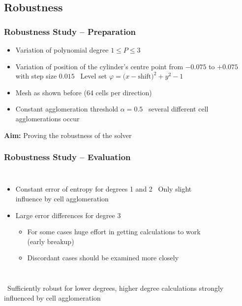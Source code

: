 	\subsection{Robustness}
	\begin{frame}
		\frametitle{Robustness Study -- Preparation}
		\begin{itemize}
			\item Variation of polynomial degree $ 1 \leq P \leq 3$
			\pause
			\item Variation of position of the cylinder's centre point from $-0.075$ to $+0.075$ with step size $0.015$ \newline \MVRightArrow \, Level set $\varphi  = (x-\text{shift)}^2 + y^2 -1$
			\pause
			\item Mesh as shown before (64 cells per direction)
			\pause
			\item Constant agglomeration threshold $\alpha = 0.5$  \newline \MVRightArrow \, several different cell agglomerations occur			
		\end{itemize}
		\vspace{0.5cm}
		\pause
		\begin{center}
			\large
			\textbf{Aim:} Proving the robustness of the solver
		\end{center}
	\end{frame}
	\begin{frame}
		\frametitle{Robustness Study -- Evaluation}
		\begin{columns}[t]
	\column[]{6cm}
		\vspace{-0.5cm}
	\begin{itemize}
		\item Constant error of entropy for degrees 1 and 2 \newline \MVRightarrow \, Only slight influence by cell agglomeration
		\pause
		\item Large error differences for degree 3
		\begin{itemize}
			\item For some cases huge effort in getting calculations to work (early breakup)
			\item Discordant cases should be examined more closely
		\end{itemize}
	\end{itemize}
	\column[]{6cm}
	\onslide
			\begin{figure}[htp]	
				\vspace{-1cm}
				\centering
				
			\end{figure}
		\end{columns}
		\pause
	\begin{center}
		\large
		\MVRightarrow \, Sufficiently robust for lower degrees, higher degree calculations strongly influenced by cell agglomeration
	\end{center}
	\end{frame}
